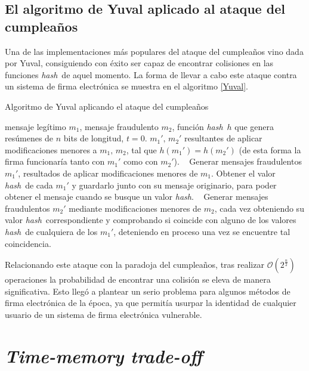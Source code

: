 \documentclass[12pt,spanish,listoffigures,listoftables,listofalgorithms]{tfgetsinf}
\newcommand{\hash}{\textit{hash}}
\begin{document}
\subsection{El algoritmo de Yuval aplicado al ataque del cumpleaños}

Una de las implementaciones más populares del ataque del cumpleaños vino dada por Yuval, consiguiendo con éxito ser capaz de encontrar colisiones en las funciones \hash~de aquel momento. La forma de llevar a cabo este ataque contra un sistema de firma electrónica se muestra en el algoritmo \ref{Yuval}.

\begin{algorithm}[H]
	\caption{Algoritmo de Yuval aplicando el ataque del cumpleaños}\label{Yuval}
	\begin{algorithmic}
		\REQUIRE mensaje legítimo $m_1$, mensaje fraudulento $m_2$, función \hash~$h$ que genera resúmenes de $n$ bits de longitud, $t = 0$.
		\ENSURE $m_1',\, m_2'$ resultantes de aplicar modificaciones menores a $m_1,\, m_2$, tal que $h(m_1') = h(m_2')$ (de esta forma la firma funcionaría tanto con $m_1'$ como con $m_2'$).
		\STATE ~
		\STATE Generar mensajes fraudulentos $m_1'$, resultados de aplicar modificaciones menores de $m_1$.
		\STATE Obtener el valor \hash~de cada $m_1'$ y guardarlo junto con su mensaje originario, para poder obtener el mensaje cuando se busque un valor \hash.
		\ENDWHILE
		\STATE ~
		\STATE Generar mensajes fraudulentos $m_2'$ mediante modificaciones menores de $m_2$, cada vez obteniendo su valor \hash~correspondiente y comprobando si coincide con alguno de los valores \hash~de cualquiera de los $m_1'$, deteniendo en proceso una vez se encuentre tal coincidencia.
		\ENDWHILE
	\end{algorithmic}
\end{algorithm}

Relacionando este ataque con la paradoja del cumpleaños, tras realizar $\mathcal{O}(2^{\frac{n}{2}})$ operaciones la probabilidad de encontrar una colisión se eleva de manera significativa. Esto llegó a plantear un serio problema para algunos métodos de firma electrónica de la época, ya que permitía usurpar la identidad de cualquier usuario de un sistema de firma electrónica vulnerable.

\section{\textit{Time-memory trade-off}} \label{tmto}
\end{document}
